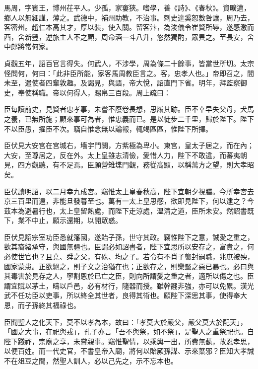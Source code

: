 \begin{pinyinscope}
 馬周，字賓王，博州茌平人。少孤，家窶狹。嗜學，善《詩》、《春秋》。資曠邁，鄉人以無細謹，薄之。武德中，補州助教，不治事。刺史達奚恕數咎讓，周乃去，客密州。趙仁本高其才，厚以裝，使入關。留客汴，為浚儀令崔賢所辱，遂感激而西，舍新豐，逆旅主人不之顧，周命酒一斗八升，悠然獨酌，眾異之。至長安，舍中郎將常何家。



 貞觀五年，詔百官言得失。何武人，不涉學，周為條二十餘事，皆當世所切。太宗怪問何，何曰：「此非臣所能，家客馬周教臣言之。客，忠孝人也。」帝即召之，間未至，遣使者四輩敦趣。及謁見，與語，帝大悅，詔直門下省。明年，拜監察御史，奉使稱職。帝以何得人，賜帛三百段。周上疏曰：



 臣每讀前史，見賢者忠孝事，未嘗不廢卷長想，思履其跡。臣不幸早失父母，犬馬之養，已無所施；顧來事可為者，惟忠義而已。是以徒步二千里，歸於陛下。陛下不以臣愚，擢臣不次。竊自惟念無以論報，輒竭區區，惟陛下所擇。



 臣伏見大安宮在宮城右，墻宇門闕，方紫極為卑小。東宮，皇太子居之，而在內；大安，至尊居之，反在外。太上皇雖志清儉，愛惜人力，陛下不敢違，而蕃夷朝見，四方觀聽，有不足焉。臣願營雉堞門觀，務從高顯，以稱萬方之望，則大孝昭矣。



 臣伏讀明詔，以二月幸九成宮。竊惟太上皇春秋高，陛下宜朝夕視膳。今所幸宮去京三百里而遠，非能旦發暮至也。萬有一太上皇思感，欲即見陛下，何以逮之？今茲本為避暑行也，太上皇留熱處，而陛下走涼處，溫清之道，臣所未安。然詔書既下，業不中止，願示還期，以開眾惑。



 臣伏見詔宗室功臣悉就籓國，遂貽子孫，世守其政。竊惟陛下之意，誠愛之重之，欲其裔緒承守，與國無疆也。臣謂必如詔書者，陛下宜思所以安存之，富貴之，何必使世官也？且堯、舜之父，有硃、均之子。若令有不肖子襲封嗣職，兆庶被殃，國家蒙患。正欲絕之，則子文之治猶在也；正欲存之，則欒黶之惡已暴也。必曰與其毒害於見存之人，寧割恩於已亡之臣，則向所謂愛之重之者，適所以傷之也。臣謂宜賦以茅土，疇以戶邑，必有材行，隨器而授。雖幹翮非強，亦可以免累。漢光武不任功臣以吏事，所以終全其世者，良得其術也。願陛下深思其事，使得奉大恩，而子孫終其福祿也。



 臣聞聖人之化天下，莫不以孝為本，故曰：「孝莫大於嚴父，嚴父莫大於配天」，「國之大事，在祀與戎」，孔子亦言「吾不與祭，如不祭」，是聖人之重祭祀也。自陛下踐祚，宗廟之享，未嘗親事。竊惟聖情，以乘輿一出，所費無蓺，故忍孝思，以便百姓。而一代史官，不書皇帝入廟，將何以貽厥孫謀、示來葉邪？臣知大孝誠不在俎豆之間，然聖人訓人，必以己先之，示不忘本也。




\end{pinyinscope}
